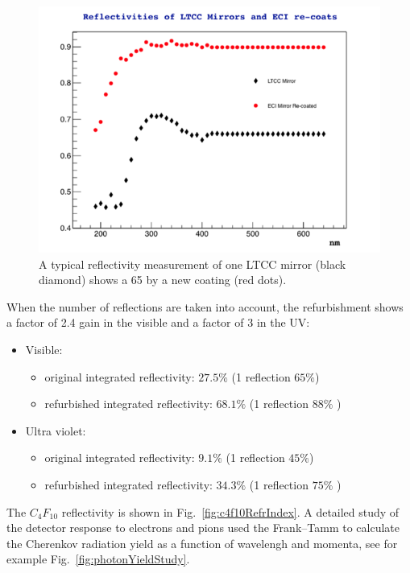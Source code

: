 \begin{figure}[hbt]
	\centering
	\includegraphics[width=1.0\columnwidth,keepaspectratio]{img/reflectivityGain.png}
	\caption{A typical reflectivity measurement of one LTCC mirror (black diamond) shows a 65%
		      by a new coating (red dots). }
	\label{fig:reflectivityGain}
\end{figure}

When the number of reflections are taken into account, the refurbishment shows
a factor of 2.4 gain in the visible and a factor of 3 in the UV:

\begin{itemize}
	\item Visible:
	\begin{itemize}
		\item original integrated reflectivity: $27.5\%$ (1 reflection $65\%$)
		\item refurbished integrated reflectivity: $68.1\%$  (1 reflection $88\%$ )
	\end{itemize}
	\item Ultra violet:
	\begin{itemize}
		\item original integrated reflectivity: $9.1\%$ (1 reflection $45\%$)
		\item refurbished integrated reflectivity: $34.3\%$  (1 reflection $75\%$ )
	\end{itemize}
\end{itemize}

The $C_4F_{10}$ reflectivity is shown in Fig.~\ref{fig:c4f10RefrIndex}. A detailed study of the detector response to electrons and pions used the Frank–Tamm to calculate
the Cherenkov radiation yield as a function of wavelengh and momenta, see for example Fig.~\ref{fig:photonYieldStudy}.

